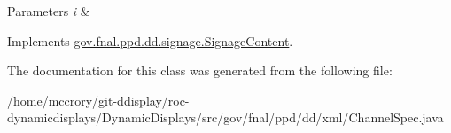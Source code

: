 \begin{DoxyParams}{Parameters}
{\em i} & \\
\hline
\end{DoxyParams}


Implements \hyperlink{interfacegov_1_1fnal_1_1ppd_1_1dd_1_1signage_1_1SignageContent_a59c75e24dcec3ea729297104328a7852}{gov.\-fnal.\-ppd.\-dd.\-signage.\-Signage\-Content}.



The documentation for this class was generated from the following file\-:\begin{DoxyCompactItemize}
\item 
/home/mccrory/git-\/ddisplay/roc-\/dynamicdisplays/\-Dynamic\-Displays/src/gov/fnal/ppd/dd/xml/Channel\-Spec.\-java\end{DoxyCompactItemize}
